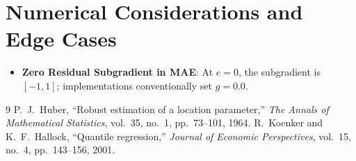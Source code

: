 \documentclass[11pt,a4paper]{article}
\theoremstyle{definition}
\begin{document}
\section{Numerical Considerations and Edge Cases}

\begin{itemize}
    \item \textbf{Zero Residual Subgradient in MAE}: At $e=0$, the subgradient is $[-1, 1]$; implementations conventionally set $g = 0.0$.
\end{itemize}

\begin{thebibliography}{9}
 P.~J.~Huber, ``Robust estimation of a location parameter,'' \emph{The Annals of Mathematical Statistics}, vol.~35, no.~1, pp.~73--101, 1964.
 R.~Koenker and K.~F.~Hallock, ``Quantile regression,'' \emph{Journal of Economic Perspectives}, vol.~15, no.~4, pp.~143--156, 2001.
\end{thebibliography}
\end{document}
